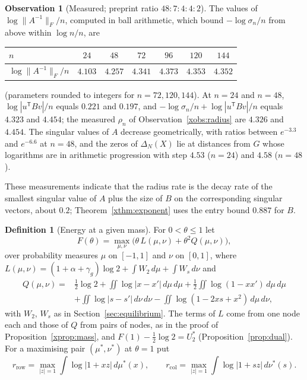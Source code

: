 \documentclass[11pt]{article}
\theoremstyle{definition}
\newtheorem{definition}[theorem]{Definition}
\newtheorem{observation}[theorem]{Observation}
\begin{document}
\begin{observation}[Measured; preprint ratio $48:7:4:4:2$]\label{xobs:smin}
The values of $\log\|A^{-1}\|_F/n$, computed in ball arithmetic, which bound $-\log\sigma_n/n$ from above within $\log n/n$, are
\begin{center}
\begin{tabular}{lcccccc}
\toprule
$n$ & $24$ & $48$ & $72$ & $96$ & $120$ & $144$\\
\midrule
$\log\|A^{-1}\|_F/n$ & $4.103$ & $4.257$ & $4.341$ & $4.373$ & $4.353$ & $4.352$\\
\bottomrule
\end{tabular}
\end{center}
(parameters rounded to integers for $n=72,120,144$). At $n=24$ and $n=48$, $\log|u^{\mathsf T}Bv|/n$ equals $0.221$ and $0.197$, and $-\log\sigma_n/n+\log|u^{\mathsf T}Bv|/n$ equals $4.323$ and $4.454$; the measured $\rho_n$ of Observation~\ref{xobs:radius} are $4.326$ and $4.454$. The singular values of $A$ decrease geometrically, with ratios between $e^{-3.3}$ and $e^{-6.6}$ at $n=48$, and the zeros of $\Delta_N(X)$ lie at distances from $G$ whose logarithms are in arithmetic progression with step $4.53$ ($n=24$) and $4.58$ ($n=48$).
\end{observation}

These measurements indicate that the radius rate is the decay rate of the smallest singular value of $A$ plus the size of $B$ on the corresponding singular vectors, about $0.2$; Theorem~\ref{xthm:exponent} uses the entry bound $0.887$ for $B$.

\begin{definition}[Energy at a given mass]\label{xdef:Fmass}
For $0<\theta\le1$ let
\[
F(\theta)=\max_{\mu,\nu}\Big(\theta\,L(\mu,\nu)+\theta^2Q(\mu,\nu)\Big),
\]
over probability measures $\mu$ on $[-1,1]$ and $\nu$ on $[0,1]$, where $L(\mu,\nu)=(1+\alpha+\gamma_g)\log2+\int W_2\,d\mu+\int W_s\,d\nu$ and
\[
\begin{aligned}Q(\mu,\nu)={}&\tfrac12\log2+\iint\log|x-x'|\,d\mu\,d\mu+\tfrac12\iint\log(1-xx')\,d\mu\,d\mu\\&+\iint\log|s-s'|\,d\nu\,d\nu-\iint\log(1-2xs+x^2)\,d\mu\,d\nu,\end{aligned}
\]
with $W_2$, $W_s$ as in Section~\ref{sec:equilibrium}. The terms of $L$ come from one node each and those of $Q$ from pairs of nodes, as in the proof of Proposition~\ref{xprop:mass}, and $F(1)-\frac12\log2=U_2^*$ (Proposition~\ref{prop:dual}). For a maximising pair $(\mu^*,\nu^*)$ at $\theta=1$ put
\[
r_{\mathrm{row}}=\max_{|z|=1}\int\log|1+xz|\,d\mu^*(x),\qquad r_{\mathrm{col}}=\max_{|z|=1}\int\log|1+sz|\,d\nu^*(s).
\]
\end{definition}
\end{document}
